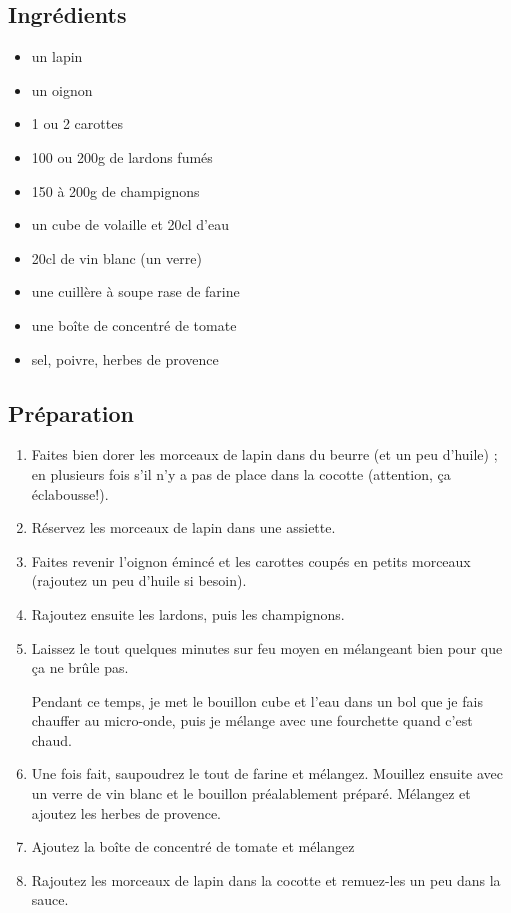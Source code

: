 \subsection*{Ingrédients}
\begin{itemize}
\item un lapin
\item un oignon
\item 1 ou 2 carottes
\item 100 ou 200g de lardons fumés
\item 150 à 200g de champignons
\item un cube de volaille et 20cl d'eau
\item 20cl de vin blanc (un verre)
\item une cuillère à soupe rase de farine
\item une boîte de concentré de tomate
\item sel, poivre, herbes de provence
\end{itemize}

\subsection*{Préparation}
\begin{enumerate}
\item Faites bien dorer les morceaux de lapin dans du beurre (et un peu d'huile) ; en plusieurs fois s'il n'y a pas de place dans la cocotte (attention, ça éclabousse!).
\item Réservez les morceaux de lapin dans une assiette.
\item Faites revenir l'oignon émincé et les carottes coupés en petits morceaux (rajoutez un peu d'huile si besoin).
\item Rajoutez ensuite les lardons, puis les champignons.
\item Laissez le tout quelques minutes sur feu moyen en mélangeant bien pour que ça ne brûle pas.
\begin{remarque}
Pendant ce temps, je met le bouillon cube et l'eau dans un bol que je fais chauffer au micro-onde, puis je mélange avec une fourchette quand c'est chaud.
\end{remarque}
\item Une fois fait, saupoudrez le tout de farine et mélangez. Mouillez ensuite avec un verre de vin blanc et le bouillon préalablement préparé. Mélangez et ajoutez les herbes de provence.
\item Ajoutez la boîte de concentré de tomate et mélangez
\item Rajoutez les morceaux de lapin dans la cocotte et remuez-les un peu dans la sauce.
\end{enumerate}

